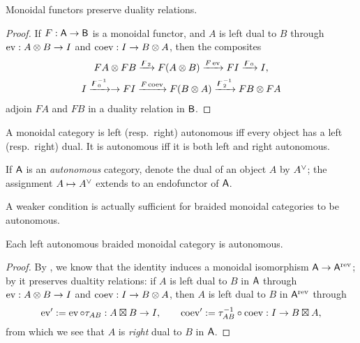 \begin{proposition}
  \label{thm:funct-dual}
  Monoidal functors preserve duality relations.  
\end{proposition}
\begin{proof}
  If $F: \mathsf{A} \to \mathsf{B}$ is a monoidal functor, and $A$ is left dual to $B$
  through $\operatorname{ev}: A\otimes B \to I$ and $\operatorname{coev}: I\to B\otimes A$, then the composites
  \begin{gather*}
      FA\otimes FB \xrightarrow{\digamma_2} F(A\otimes B) \xrightarrow{F\operatorname{ev}} FI
      \xrightarrow{\digamma_0} I, 
      \\
      I \xrightarrow{\digamma_0\sp{-1}}\to FI \xrightarrow{F\operatorname{coev}} F(B\otimes A)
      \xrightarrow{\digamma_2\sp{-1}} FB\otimes FA
  \end{gather*}
  adjoin $FA$ and $FB$ in a duality relation in $\mathsf{B}$.
\end{proof}

\begin{definition}\label{dfn:autonomous-category}
  A monoidal category is left (resp.\ right) autonomous iff every
  object has a left (resp.\ right) dual. It is autonomous iff it is
  both left and right autonomous.
\end{definition}
If $\mathsf{A}$ is an \emph{autonomous} category, denote the dual of an object
$A$ by $\rdl{A}$; the assignment $A \mapsto \rdl{A}$ extends to an
endofunctor of $\mathsf{A}$.

A weaker condition is actually sufficient for braided
monoidal categories to be autonomous.
\begin{proposition}
\label{thm:ev-rev}
  Each left autonomous braided monoidal category is autonomous.  
\end{proposition}
\begin{proof}
  By , we know that the identity induces a monoidal
  isomorphism $\mathsf{A} \to \mathsf{A}\sp{\text{rev}}$; by  it preserves
  dualtity relations: if $A$ is left dual to $B$ in $\mathsf{A}$ through $\operatorname{ev}:
  A\otimes B \to I$ and $\operatorname{coev}: I\to B\otimes A$, then $A$ is left dual to $B$ in
  $\mathsf{A}\sp{\text{rev}}$ through
  \begin{equation*}
    \operatorname{ev}' := \operatorname{ev} \circ \tau_{AB} : A\boxtimes B \to I, 
    \qquad
    \operatorname{coev}' := \tau_{AB}\sp{-1} \circ \operatorname{coev} : I \to B\boxtimes A,
  \end{equation*}
  from which we see that $A$ is \emph{right} dual to $B$ in $\mathsf{A}$.
\end{proof}


